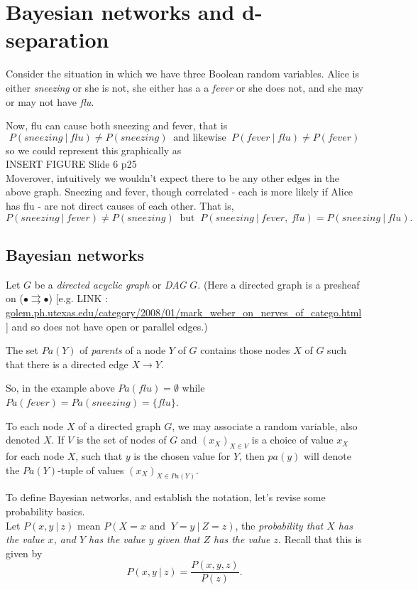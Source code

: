 \documentclass[11pt, oneside]{article}   	%
\begin{document}
\section{Bayesian networks and d-separation}



Consider the situation in which we have three Boolean random variables. Alice is either \emph{sneezing} or she is not, she either has a  a \emph{fever} or she does not, and she may or may not have \emph{flu}.

Now, flu can cause both sneezing and fever, that is
\[ P(sneezing \ | \ flu ) \neq P( sneezing) \  \text{ and likewise } \ P(fever \ | \ flu ) \neq P( fever) \]
so we could represent this graphically as
\\
INSERT FIGURE Slide 6 p25
\\
Moverover, intuitively we wouldn't expect there to be any other edges in the above graph. Sneezing and fever, though correlated - each is more likely if Alice has flu - are not direct causes of each other.  That is,
\[ P(sneezing \ | \ fever ) \neq P(sneezing) \  \text{ but } \ P(sneezing \ | \ fever, \ flu ) = P(sneezing \ | \ flu).\]




\subsection{Bayesian networks}
Let $G$ be a \emph{directed acyclic graph} or \emph{DAG} $G$. (Here a directed graph is a presheaf on ($ \bullet \rightrightarrows \bullet$) [e.g. LINK : \href{https://golem.ph.utexas.edu/category/2008/01/mark_weber_on_nerves_of_catego.html}{golem.ph.utexas.edu/category/2008/01/mark\_weber\_on\_nerves\_of\_catego.html}] and so does not have open or parallel edges.)

The set $Pa(Y)$ of \emph{parents} of a node $Y$ of $G$ contains those nodes $X$ of $G$ such that there is a directed edge $X \to Y$.

So, in the example above $Pa(flu) = \emptyset$ while $Pa(fever) = Pa(sneezing) = \{ flu \}$.


To each node $X$ of a directed graph $G$, we may associate a random variable, also denoted $X$. If $V$ is the set of nodes of $G$ and $(x_X)_{X \in V}$ is a choice of value $x_X$ for each node $X$, such that $y$ is the chosen value for $Y$, then $pa(y)$ will denote the $Pa(Y)$-tuple of values $(x_X)_{X \in Pa(Y)}$. 


To define Bayesian networks, and establish the notation, let's revise some probability basics.
\\
Let $P(x,y \ | \ z)$ mean $P(X = x \text{ and } \ Y = y \ | \ Z = z)$, the \emph{probability that $X$ has the value $x$, and $Y$ has the value $y$ given that $Z$ has the value $z$}. Recall that this is given by
\[ P(x,y \ |\ z) = \frac{ P(x,y,z) }{P(z)}.\]
\end{document}
